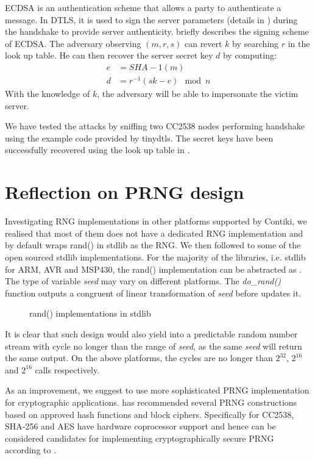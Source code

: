 \begin{itemize}
	ECDSA is an authentication scheme that allows a party to authenticate a message. In DTLS, it is used to sign the server parameters (details in \cite{rfc3279}) during the handshake to provide server authenticity.  briefly describes the signing scheme of ECDSA. The adversary observing $(m,r,s)$ can revert $k$ by searching $r$ in the look up table. He can then recover the server secret key $d$ by computing:
	\begin{equation}
		\begin{aligned}
		e &= SHA-1(m) \\
		d &= r^{-1}(sk - e) \mod n
		\end{aligned}
	\end{equation}
	With the knowledge of $k$, the adversary will be able to impersonate the victim server.
\end{itemize}

We have tested the attacks by sniffing two CC2538 nodes performing handshake using the example code provided by tinydtls. The secret keys have been successfully recovered using the look up table in \cite{prngtest}.

\section{Reflection on PRNG design}\label{PRNGReflection}
Investigating RNG implementations in other platforms supported by Contiki, we realised that most of them does not have a dedicated RNG implementation and by default wraps rand() in stdlib as the RNG. We then followed to some of the open sourced stdlib implementations. For the majority of the libraries, i.e. stdlib for ARM\cite{ARMrand}, AVR\cite{AVRrand} and MSP430\cite{MSP430rand}, the rand() implementation can be abstracted as . The type of variable \textit{seed}  may vary on different platforms. The \textit{do\_rand()} function outputs a congruent of linear transformation of \textit{seed} before updates it.
 
\begin{figure}

\caption{rand() implementations in stdlib}
\label{rand}
\end{figure}

It is clear that such design would also yield into a predictable random number stream with cycle no longer than the range of \textit{seed}, as the same \textit{seed} will return the same output. On the above platforms, the cycles are no longer than $2^{32}$, $2^{16}$ and $2^{16}$ calls respectively.

As an improvement, we suggest to use more sophisticated PRNG implementation for cryptographic applications. \cite{NISTPRNG} has recommended several PRNG constructions based on approved hash functions and block ciphers. Specifically for CC2538, SHA-256 and AES have hardware coprocessor support and hence can be considered candidates for implementing cryptographically secure PRNG according to \cite{NISTPRNG}.

